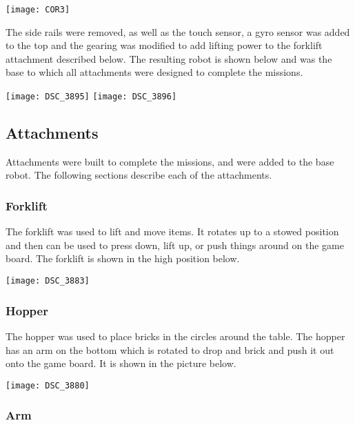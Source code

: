 \documentclass[letter, article]{article}
\begin{document}
\begin{center}
\texttt{[image: COR3]}
\end{center}

The side rails were removed, as well as the touch sensor, a gyro sensor was added to the top and the gearing was modified to add lifting power to the forklift attachment described below.  The resulting robot is shown below and was the base to which all attachments were designed to complete the missions.

\begin{center}
\texttt{[image: DSC\_3895]}
\texttt{[image: DSC\_3896]}
\end{center}

\subsection{Attachments}

Attachments were built to complete the missions, and were added to the base robot.  The following sections describe each of the attachments.

\subsubsection{Forklift}

The forklift was used to lift and move items.  It rotates up to a stowed position and then can be used to press down, lift up, or push things around on the game board.  The forklift is shown in the high position below.

\begin{center}
\texttt{[image: DSC\_3883]}
\end{center}

\subsubsection{Hopper}

The hopper was used to place bricks in the circles around the table.  The hopper has an arm on the bottom which is rotated to drop and brick and push it out onto the game board.  It is shown in the picture below.

\begin{center}
\texttt{[image: DSC\_3880]}
\end{center}

\subsubsection{Arm}
\end{document}
